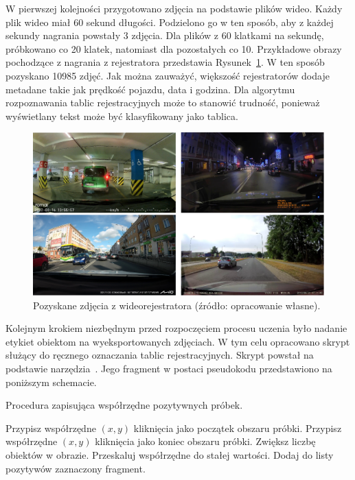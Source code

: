 W pierwszej kolejności przygotowano zdjęcia na podstawie plików wideo.
Każdy plik wideo miał 60 sekund długości.
Podzielono go w ten sposób, aby z każdej sekundy nagrania powstały 3 zdjęcia.
Dla plików z 60 klatkami na sekundę, próbkowano co 20 klatek, natomiast dla pozostałych co 10.
Przykładowe obrazy pochodzące z nagrania \linebreak z rejestratora przedstawia Rysunek~\ref{fig:captured_frame}.
W ten sposób pozyskano 10985 zdjęć.
Jak można zauważyć, większość rejestratorów dodaje metadane takie jak prędkość pojazdu, data \linebreak i godzina.
Dla algorytmu rozpoznawania tablic rejestracyjnych może to stanowić trudność, ponieważ wyświetlany tekst może być klasyfikowany jako tablica.
\begin{figure}[!ht]
    \centering
    \includegraphics[scale=0.4]{Pictures/captured_frames}
    \caption{Pozyskane zdjęcia z wideorejestratora (źródło: opracowanie własne).}
    \label{fig:captured_frame}
\end{figure}
\FloatBarrier

Kolejnym krokiem niezbędnym przed rozpoczęciem procesu uczenia było nadanie etykiet obiektom na wyeksportowanych zdjęciach.
W tym celu opracowano skrypt służący do ręcznego oznaczania tablic rejestracyjnych.
Skrypt powstał na podstawie narzędzia~\cite{haar_object_marker}.
Jego fragment w postaci pseudokodu przedstawiono na poniższym schemacie.
\begin{algorithm}
    \caption{Procedura zapisująca współrzędne pozytywnych próbek.}
    \begin{algorithmic}[1]
        \label{create_positives}
                    \State Przypisz współrzędne $(x,y)$ kliknięcia jako początek obszaru próbki.
                \Else
                    \State Przypisz współrzędne $(x,y)$ kliknięcia jako koniec obszaru próbki.
                    \State Zwiększ liczbę obiektów w obrazie.
                    \State Przeskaluj współrzędne do stałej wartości.
                    \State Dodaj do listy pozytywów zaznaczony fragment.
                \EndIf
            \EndIf
        \EndProcedure
    \end{algorithmic}
\end{algorithm}
\FloatBarrier


